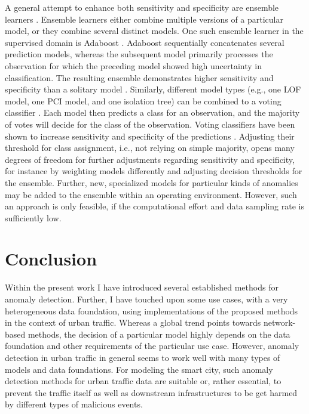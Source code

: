 \documentclass[conference]{IEEEtran}
\begin{document}
A general attempt to enhance both sensitivity and specificity are ensemble learners \cite{sagi2018ensemble}. Ensemble learners either combine multiple versions of a particular model, or they combine several distinct models. One such ensemble learner in the supervised domain is Adaboost \cite{freund1996experiments}. Adaboost sequentially concatenates several prediction models, whereas the subsequent model primarily processes the observation for which the preceding model showed high uncertainty in classification. The resulting ensemble demonstrates higher sensitivity and specificity than a solitary model \cite{freund1996experiments}. Similarly, different model types (e.g., one LOF model, one PCI model, and one isolation tree) can be combined to a voting classifier \cite{sagi2018ensemble}. Each model then predicts a class for an observation, and the majority of votes will decide for the class of the observation. Voting classifiers have been shown to increase sensitivity and specificity of the predictions \cite{sagi2018ensemble}. Adjusting their threshold for class assignment, i.e., not relying on simple majority, opens many degrees of freedom for further adjustments regarding sensitivity and specificity, for instance by weighting models differently and adjusting decision thresholds for the ensemble. Further, new, specialized models for particular kinds of anomalies may be added to the ensemble within an operating environment. However, such an approach is only feasible, if the computational effort and data sampling rate is sufficiently low.

\section{Conclusion}

Within the present work I have introduced several established methods for anomaly detection. Further, I have touched upon some use cases, with a very heterogeneous data foundation, using implementations of the proposed methods in the context of urban traffic. Whereas a global trend points towards network-based methods, the decision of a particular model highly depends on the data foundation and other requirements of the particular use case. However, anomaly detection in urban traffic in general seems to work well with many types of models and data foundations. For modeling the smart city, such anomaly detection methods for urban traffic data are suitable or, rather essential, to prevent the traffic itself as well as downstream infrastructures to be get harmed by different types of malicious events.
\end{document}
